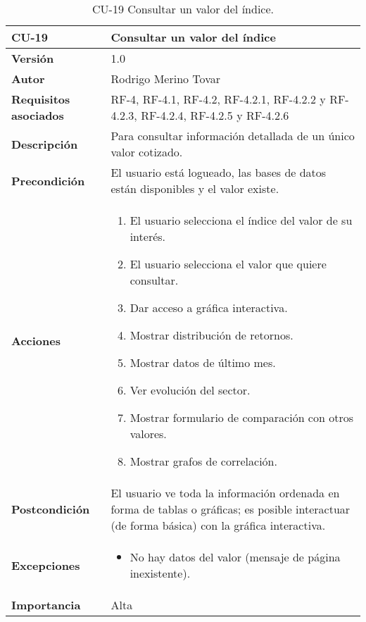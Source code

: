 \begin{table}[p]
	\centering
	\begin{tabularx}{\linewidth}{ p{} p{} }
		\toprule
		\textbf{CU-19}    & \textbf{Consultar un valor del índice}\\
		\toprule
		\textbf{Versión}              & 1.0    \\
		\textbf{Autor}                & Rodrigo Merino Tovar \\
		\textbf{Requisitos asociados} & RF-4, RF-4.1, RF-4.2, RF-4.2.1, RF-4.2.2 y RF-4.2.3, RF-4.2.4, RF-4.2.5 y RF-4.2.6 \\
		\textbf{Descripción}          & Para consultar información detallada de un único valor cotizado.\\
		\textbf{Precondición}         & El usuario está logueado, las bases de datos están disponibles y el valor existe.  \\
		\textbf{Acciones}             &
		\begin{enumerate}
			\def\labelenumi{\arabic{enumi}.}
			\tightlist
			\item El usuario selecciona el índice del valor de su interés. 
			\item El usuario selecciona el valor que quiere consultar. 
			\item Dar acceso a gráfica interactiva.
			\item Mostrar distribución de retornos.
			\item Mostrar datos de último mes.
			\item Ver evolución del sector.
			\item Mostrar formulario de comparación con otros valores.
			\item Mostrar grafos de correlación.
		\end{enumerate}\\
		\textbf{Postcondición}        & El usuario ve toda la información ordenada en forma de tablas o gráficas; es posible interactuar (de forma básica) con la gráfica interactiva. \\
		\textbf{Excepciones}          & 
		\begin{itemize}
			\tightlist
			\item No hay datos del valor (mensaje de página inexistente).
		\end{itemize} \\
		\textbf{Importancia}          & Alta \\
		\bottomrule
	\end{tabularx}
	\caption{CU-19 Consultar un valor del índice.}
\end{table}


